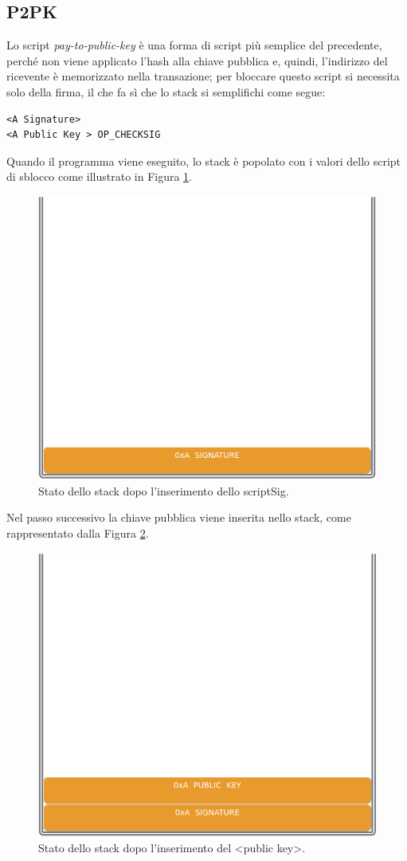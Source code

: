 \subsection{P2PK}
Lo script {\it pay-to-public-key \/} è una forma di script più semplice del precedente, perché non viene applicato l’hash alla chiave pubblica e, quindi, l’indirizzo del ricevente è memorizzato nella transazione; per bloccare questo script si necessita solo della firma, il che fa sì che lo stack si semplifichi come segue:
\begin{lstlisting}[language=bitcoinscript, caption={P2PK Script completo}]
<A Signature>
<A Public Key > OP_CHECKSIG
\end{lstlisting}

Quando il programma viene eseguito, lo stack è popolato con i valori dello script di sblocco come illustrato in Figura \ref{fig:stackp2pk01}.

\begin{figure}[h]
\begin{center}
\includegraphics[width=0.6\columnwidth]{images/script/p2pk/1.png}
\end{center}
\caption{Stato dello stack dopo l’inserimento dello scriptSig.}
\label{fig:stackp2pk01}
\end{figure}

Nel passo successivo la chiave pubblica viene inserita nello stack, come rappresentato dalla Figura \ref{fig:stackp2pk02}.

\begin{figure}[h]
\begin{center}
\includegraphics[width=0.6\columnwidth]{images/script/p2pk/2.png}
\end{center}
\caption{Stato dello stack dopo l’inserimento del <public key>.}
\label{fig:stackp2pk02}
\end{figure}

